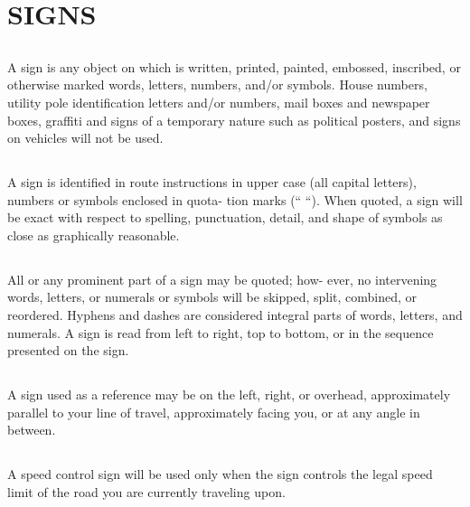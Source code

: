 \section{SIGNS}

\subsection {} 
A sign is any object on which is written, printed,
painted, embossed, inscribed, or otherwise marked words,
letters, numbers, and/or symbols. House numbers, utility
pole identification letters and/or numbers, mail boxes and
newspaper boxes, graffiti and signs of a temporary nature
such as political posters, and signs on vehicles will not be
used.

\subsection {}
A sign is identified in route instructions in upper case
(all capital letters), numbers or symbols enclosed in quota-
tion marks (“ “). When quoted, a sign will be exact with
respect to spelling, punctuation, detail, and shape of
symbols as close as graphically reasonable.

\subsection {}
All or any prominent part of a sign may be quoted; how-
ever, no intervening words, letters, or numerals or symbols
will be skipped, split, combined, or reordered. Hyphens and
dashes are considered integral parts of words, letters, and
numerals. A sign is read from left to right, top to bottom, or in
the sequence presented on the sign.

\subsection {}
A sign used as a reference may be on the left, right, or
overhead, approximately parallel to your line of travel,
approximately facing you, or at any angle in between.

\subsection {}
A speed control sign will be used only when the sign
controls the legal speed limit of the road you are currently
traveling upon.